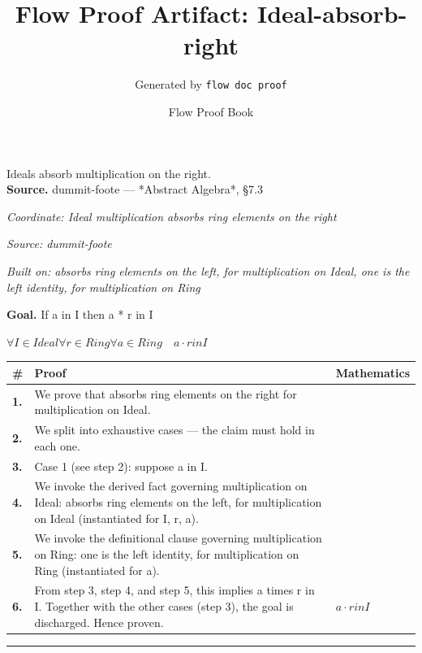 \documentclass[11pt]{article}
\title{Flow Proof Artifact: Ideal-absorb-right}
\author{Generated by \texttt{flow doc proof}}
\date{Flow Proof Book}
\theoremstyle{definition}
\begin{document}
\maketitle
Ideals absorb multiplication on the right.\\[0.5em]
\textbf{Source.} dummit-foote — *Abstract Algebra*, §7.3\\[0.5em]
\bigskip
{}\par
\smallskip\noindent\textit{Coordinate: Ideal \cdot multiplication \cdot absorbs ring elements on the right}\par
\smallskip\noindent\textit{Source: dummit-foote}\par
\smallskip\noindent\textit{Built on: absorbs ring elements on the left, for multiplication on Ideal, one is the left identity, for multiplication on Ring}\par
\medskip
\noindent\textbf{Goal.} If a in I then a * r in I\par
\noindent$\displaystyle \forall I \in Ideal \forall r \in Ring \forall a \in Ring\quad a \cdot r in I$\par
\medskip
\noindent
\begin{tabular}{@{} >{\raggedright\arraybackslash}p{} >{\raggedright\arraybackslash}p{} >{\raggedleft\arraybackslash}p{} @{}}
\textbf{\#} & \textbf{Proof} & \textbf{Mathematics} \\
\midrule
\textbf{1.} & We prove that absorbs ring elements on the right for multiplication on Ideal. & \\[0.45em]
\textbf{2.} & We split into exhaustive cases — the claim must hold in each one. & \\[0.45em]
\textbf{3.} & Case 1 (see step 2): suppose a in I. & \\[0.45em]
\textbf{4.} & We invoke the derived fact governing multiplication on Ideal: absorbs ring elements on the left, for multiplication on Ideal (instantiated for I, r, a). & \\[0.45em]
\textbf{5.} & We invoke the definitional clause governing multiplication on Ring: one is the left identity, for multiplication on Ring (instantiated for a). & \\[0.45em]
\textbf{6.} & From step 3, step 4, and step 5, this implies a times r in I. Together with the other cases (step 3), the goal is discharged. Hence proven. & $\displaystyle a \cdot r in I$ \\[0.45em]
\bottomrule
\end{tabular}
\label{thm:Ideal-multiplication-absorbs_ring_elements_on_the_right}
\par\medskip\hrule
\end{document}

